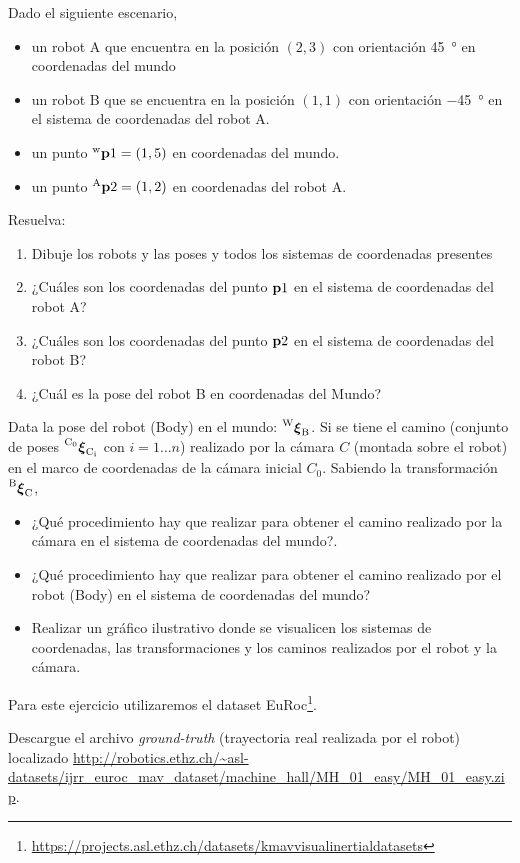 \documentclass[tp]{lcc}
\begin{document}
\ejercicio Dado el siguiente escenario,
\begin{itemize}
    \item un robot A que encuentra en la posición $(2,3)$ con orientación \SI{45}{\degree} en coordenadas del mundo
    \item un robot B que se encuentra en la posición $(1,1)$ con orientación \SI{-45}{\degree} en el sistema de coordenadas del robot A.
    \item un punto $\prescript{\mathrm{\mathrm{w}}}{}{\boldsymbol{\mathbf{p}}}1 = (1,5)$ en coordenadas del mundo.
    \item un punto $\prescript{\mathrm{A}}{}{\boldsymbol{\mathbf{p}}}2 = (1,2)$ en coordenadas del robot A.
\end{itemize}
Resuelva:
\begin{enumerate}
    \item Dibuje los robots y las poses y todos los sistemas de coordenadas presentes
    \item ¿Cuáles son los coordenadas del punto $\boldsymbol{\mathbf{p}}1$ en el sistema de coordenadas del robot A?
    \item ¿Cuáles son los coordenadas del punto $\boldsymbol{\mathbf{p}}2$ en el sistema de coordenadas del robot B?
    \item ¿Cuál es la pose del robot B en coordenadas del Mundo?
\end{enumerate}

\ejercicio Data la pose del robot (Body) en el mundo: $\prescript{\mathrm{W}}{}{{\boldsymbol{\mathbf{\xi}}}_\mathrm{B}}$. Si se tiene el camino (conjunto de poses $\prescript{\mathrm{C_{0}}}{}{{\boldsymbol{\mathbf{\xi}}}_\mathrm{C_{i}}}$ con $i = 1 \dots n$) realizado por la cámara $C$ (montada sobre el robot) en el marco de coordenadas de la cámara inicial $C_{0}$. Sabiendo la transformación $\prescript{\mathrm{B}}{}{{\boldsymbol{\mathbf{\xi}}}_\mathrm{C}}$, 
\begin{itemize}
	\item ¿Qué procedimiento hay que realizar para obtener el camino realizado por la cámara en el sistema de coordenadas del mundo?.
	\item ¿Qué procedimiento hay que realizar para obtener el camino realizado por el robot (Body) en el sistema de coordenadas del mundo?
    \item Realizar un gráfico ilustrativo donde se visualicen los sistemas de coordenadas, las transformaciones y los caminos realizados por el robot y la cámara.
\end{itemize}


\ejercicio Para este ejercicio utilizaremos el dataset EuRoc\footnote{\url{https://projects.asl.ethz.ch/datasets/kmavvisualinertialdatasets}}.

Descargue el archivo \emph{ground-truth} (trayectoria real realizada por el robot) localizado \url{ http://robotics.ethz.ch/~asl-datasets/ijrr_euroc_mav_dataset/machine_hall/MH_01_easy/MH_01_easy.zip}.
\end{document}
